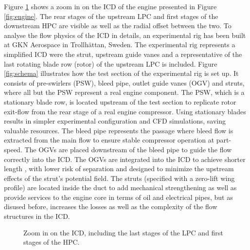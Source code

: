 Figure \ref{fig:enginezoom} shows a zoom in on the ICD of the engine presented in Figure \ref{fig:engine}. The rear stages of the upstream LPC and first stages of the downstream HPC are visible as well as the radial offset between the two. To analyse the flow physics of the ICD in details, an experimental rig has been built at GKN Aerospace in Trollh\"{a}ttan, Sweden. The experimental rig represents a simplified ICD were the strut, upstream guide vanes and a representative of the last rotating blade row (rotor) of the upstream LPC is included. Figure \ref{fig:schema} illustrates how the test section of the experimental rig is set up. It consists of pre-swirlers (PSW), bleed pipe, outlet guide vanes (OGV) and struts, where all but the PSW represent a real engine component. The PSW, which is a stationary blade row, is located upstream of the test section to replicate rotor exit-flow from the rear stage of a real engine compressor. Using stationary blades results in simpler experimental configuration and CFD simulations, saving valuable resources. The bleed pipe represents the passage where bleed flow is extracted from the main flow to ensure stable compressor operation at part-speed. The OGVs are placed downstream of the bleed pipe to guide the flow correctly into the ICD. The OGVs are integrated into the ICD to achieve shorter length \cite{Walker2011}, with lower risk of separation and designed to minimize the upstream effects of the strut's potential field. The struts (specified with a zero-lift wing profile) are located inside the duct to add mechanical strengthening as well as provide services to the engine core in terms of oil and electrical pipes, but as disused before, increases the losses as well as the complexity of the flow structures in the ICD.
\begin{figure}[H]
  \centering
\caption{Zoom in on the ICD, including the last stages of the LPC and first stages of the HPC.} \label{fig:enginezoom}
\end{figure}

